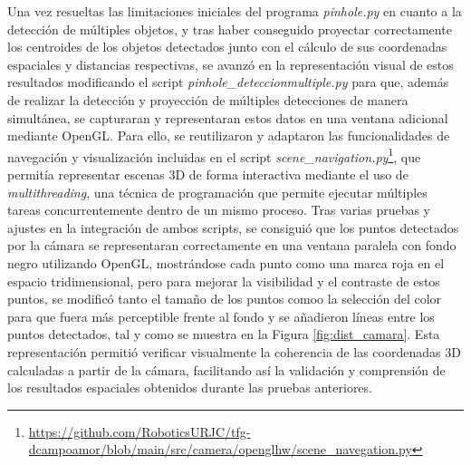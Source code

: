 Una vez resueltas las limitaciones iniciales del programa \textit{pinhole.py} en cuanto a la detección de múltiples objetos, y tras haber conseguido proyectar correctamente los centroides de los objetos detectados junto con el cálculo de sus coordenadas espaciales y distancias respectivas, se avanzó en la representación visual de estos resultados modificando el script \textit{pinhole\_deteccionmultiple.py} para que, además de realizar la detección y proyección de múltiples detecciones de manera simultánea, se capturaran y representaran estos datos en una ventana adicional mediante OpenGL. Para ello, se reutilizaron y adaptaron las funcionalidades de navegación y visualización incluidas en el script \textit{scene\_navigation.py}\footnote{\url{https://github.com/RoboticsURJC/tfg-dcampoamor/blob/main/src/camera/openglhw/scene_navegation.py}}, que permitía representar escenas 3D de forma interactiva mediante el uso de \textit{multithreading}, una técnica de programación que permite ejecutar múltiples tareas concurrentemente dentro de un mismo proceso. Tras varias pruebas y ajustes en la integración de ambos scripts, se consiguió que los puntos detectados por la cámara se representaran correctamente en una ventana paralela con fondo negro utilizando OpenGL, mostrándose cada punto como una marca roja en el espacio tridimensional, pero para mejorar la visibilidad y el contraste de estos puntos, se modificó tanto el tamaño de los puntos comoo la selección del color para que fuera más perceptible frente al fondo y se añadieron líneas entre los puntos detectados, tal y como se muestra en la Figura \ref{fig:dist_camara}. Esta representación permitió verificar visualmente la coherencia de las coordenadas 3D calculadas a partir de la cámara, facilitando así la validación y comprensión de los resultados espaciales obtenidos durante las pruebas anteriores.

